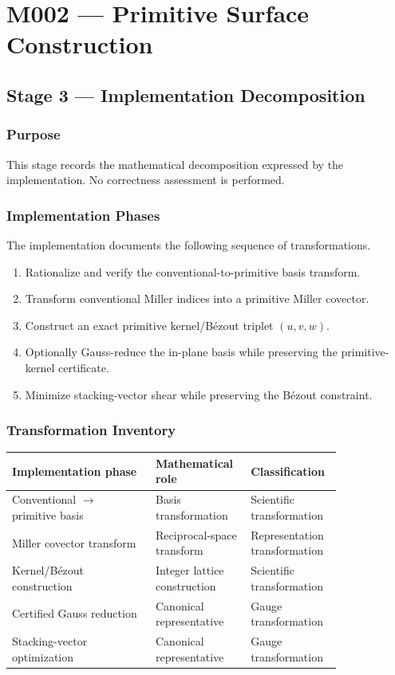 
\chapter{M002 --- Primitive Surface Construction}

\section{Stage 3 --- Implementation Decomposition}

\subsection{Purpose}

This stage records the mathematical decomposition expressed by the
implementation. No correctness assessment is performed.

\subsection{Implementation Phases}

The implementation documents the following sequence of transformations.

\begin{enumerate}
\item Rationalize and verify the conventional-to-primitive basis transform.
\item Transform conventional Miller indices into a primitive Miller covector.
\item Construct an exact primitive kernel/B\'ezout triplet $(u,v,w)$.
\item Optionally Gauss-reduce the in-plane basis while preserving the
primitive-kernel certificate.
\item Minimize stacking-vector shear while preserving the B\'ezout
constraint.
\end{enumerate}

\subsection{Transformation Inventory}

\begin{center}
\begin{tabular}{|p{0.40\linewidth}|p{0.22\linewidth}|p{0.20\linewidth}|}
\hline
Implementation phase & Mathematical role & Classification\\
\hline
Conventional $\rightarrow$ primitive basis & Basis transformation &
Scientific transformation\\
\hline
Miller covector transform & Reciprocal-space transform &
Representation transformation\\
\hline
Kernel/B\'ezout construction & Integer lattice construction &
Scientific transformation\\
\hline
Certified Gauss reduction & Canonical representative &
Gauge transformation\\
\hline
Stacking-vector optimization & Canonical representative &
Gauge transformation\\
\hline
\end{tabular}
\end{center}

